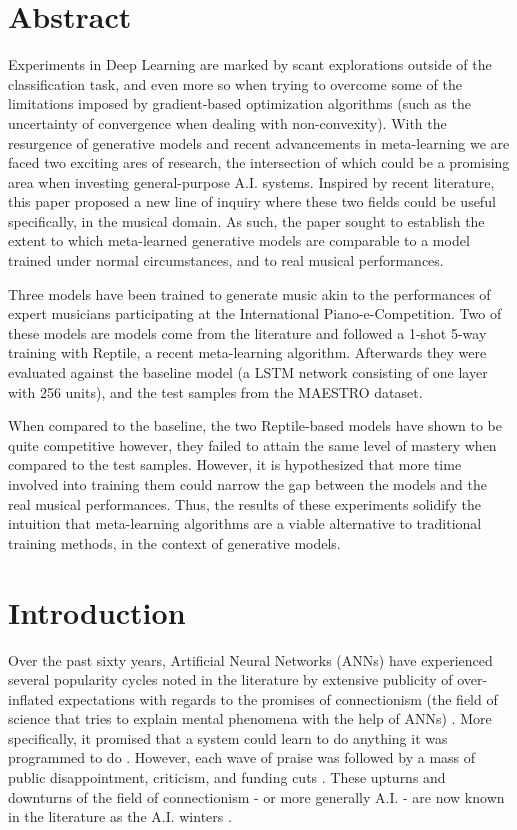 \documentclass[a4paper]{book}
\begin{document}
\chapter*{Abstract}
Experiments in Deep Learning are marked by scant explorations outside of the classification task, and even more so when trying to overcome some of the limitations imposed by gradient-based optimization algorithms (such as the uncertainty of convergence when dealing with non-convexity). With the resurgence of generative models and recent advancements in meta-learning we are faced two exciting ares of research, the intersection of which could be a promising area when investing general-purpose A.I. systems. Inspired by recent literature, this paper proposed a new line of inquiry where these two fields could be useful specifically, in the musical domain. As such, the paper sought to establish the extent to which meta-learned generative models are comparable to a model trained under normal circumstances, and to real musical performances.

Three models have been trained to generate music akin to the performances of expert musicians participating at the International Piano-e-Competition. Two of these models are models come from the literature and followed a 1-shot 5-way training with Reptile, a recent meta-learning algorithm. Afterwards they were evaluated against the baseline model (a LSTM network consisting of one layer with 256 units), and the test samples from the MAESTRO dataset.

When compared to the baseline, the two Reptile-based models have shown to be quite competitive however, they failed to attain the same level of mastery when compared to the test samples. However, it is hypothesized that more time involved into training them could narrow the gap between the models and the real musical performances. Thus, the results of these experiments solidify the intuition that meta-learning algorithms are a viable alternative to traditional training methods, in the context of generative models.


\tableofcontents

\chapter{Introduction} \label{chap:intro}

Over the past sixty years, Artificial Neural Networks (ANNs) have experienced several popularity cycles noted in the literature by extensive publicity of over-inflated expectations with regards to the promises of connectionism (the field of science that tries to explain mental phenomena with the help of ANNs) \parencite{minsky_perceptrons_1988, knight_ai_2016, nilsson_speed_2009}. More specifically, it promised that a system could learn to do anything it was programmed to do \parencite{minsky_perceptrons_1988}. However, each wave of praise was followed by a mass of public disappointment, criticism, and funding cuts \parencite[e.g.,][]{lighthill_artificial_1972}. These upturns and downturns of the field of connectionism - or more generally A.I. - are now known in the literature as the A.I. winters \parencite{nilsson_speed_2009}.
\end{document}
